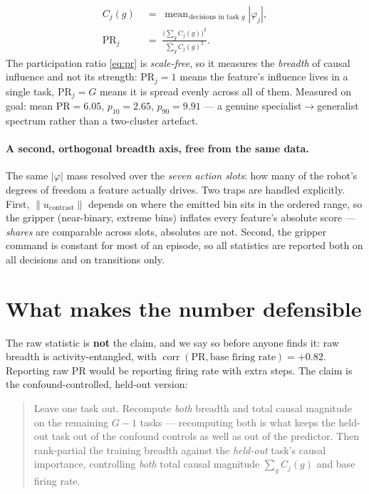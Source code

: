 \documentclass[11pt]{article}
\newcommand{\ucon}{u_{\mathrm{contrast}}}
\begin{document}
\begin{align}
C_j(g) &\;=\; \operatorname{mean}_{\,\text{decisions in task } g} \left| \varphi_j \right|,
\label{eq:cjg}\\[2pt]
\mathrm{PR}_j &\;=\; \frac{\bigl(\sum_g C_j(g)\bigr)^{2}}{\sum_g C_j(g)^{2}} .
\label{eq:pr}
\end{align}
The participation ratio \eqref{eq:pr} is \emph{scale-free}, so it measures the \emph{breadth} of
causal influence and not its strength: $\mathrm{PR}_j=1$ means the feature's influence lives
in a single task, $\mathrm{PR}_j=G$ means it is spread evenly across all of them. Measured on
goal: mean $\mathrm{PR}=6.05$, $p_{10}=2.65$, $p_{90}=9.91$ --- a genuine
specialist$\rightarrow$generalist spectrum rather than a two-cluster artefact.

\paragraph{A second, orthogonal breadth axis, free from the same data.} The same $|\varphi|$
mass resolved over the \emph{seven action slots}: how many of the robot's degrees of freedom a
feature actually drives. Two traps are handled explicitly. First, $\|\ucon\|$ depends on where
the emitted bin sits in the ordered range, so the gripper (near-binary, extreme bins) inflates
every feature's absolute score --- \emph{shares} are comparable across slots, absolutes are
not. Second, the gripper command is constant for most of an episode, so all statistics are
reported both on all decisions and on transitions only.

\section{What makes the number defensible}
\label{sec:defensible}

The raw statistic is \textbf{not} the claim, and we say so before anyone finds it: raw breadth
is activity-entangled, with $\operatorname{corr}(\mathrm{PR}, \text{base firing rate}) = +0.82$.
Reporting raw $\mathrm{PR}$ would be reporting firing rate with extra steps. The claim is the
confound-controlled, held-out version:

\begin{quote}
Leave one task out. Recompute \emph{both} breadth and total causal magnitude on the remaining
$G-1$ tasks --- recomputing both is what keeps the held-out task out of the confound controls
as well as out of the predictor. Then rank-partial the training breadth against the
\emph{held-out} task's causal importance, controlling \emph{both} total causal magnitude
$\sum_g C_j(g)$ and base firing rate.
\end{quote}
\end{document}
